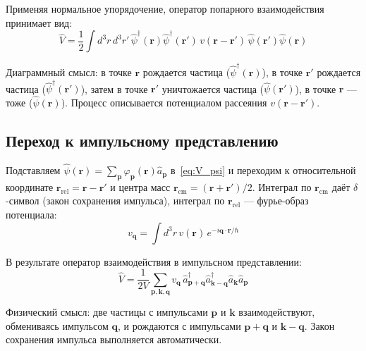 \documentclass[../general/general]{subfiles}
\begin{document}
Применяя нормальное упорядочение, оператор попарного взаимодействия принимает вид:
\begin{equation}
    \hat{V} = \frac{1}{2}\int d^3r\,d^3r'\,\hat{\psi}^\dagger(\mathbf{r})\hat{\psi}^\dagger(\mathbf{r}')\,v(\mathbf{r}-\mathbf{r}')\,\hat{\psi}(\mathbf{r}')\hat{\psi}(\mathbf{r})
    \label{eq:V_psi}
\end{equation}

Диаграммный смысл: в точке $\mathbf{r}$ рождается частица ($\hat{\psi}^\dagger(\mathbf{r})$), в точке $\mathbf{r}'$ рождается частица ($\hat{\psi}^\dagger(\mathbf{r}')$), затем в точке $\mathbf{r}'$ уничтожается частица ($\hat{\psi}(\mathbf{r}')$), в точке $\mathbf{r}$ --- тоже ($\hat{\psi}(\mathbf{r})$). Процесс описывается потенциалом рассеяния $v(\mathbf{r}-\mathbf{r}')$.

\subsection{Переход к импульсному представлению}

Подставляем $\hat{\psi}(\mathbf{r}) = \sum_\mathbf{p}\varphi_\mathbf{p}(\mathbf{r})\hat{a}_\mathbf{p}$ в~\eqref{eq:V_psi} и переходим к относительной координате $\mathbf{r}_{\text{rel}} = \mathbf{r} - \mathbf{r}'$ и центра масс $\mathbf{r}_{\text{cm}} = (\mathbf{r}+\mathbf{r}')/2$. Интеграл по $\mathbf{r}_{\text{cm}}$ даёт $\delta$-символ (закон сохранения импульса), интеграл по $\mathbf{r}_{\text{rel}}$ --- фурье-образ потенциала:
\begin{equation}
    v_\mathbf{q} = \int d^3r\,v(\mathbf{r})\,e^{-i\mathbf{q}\cdot\mathbf{r}/\hbar}
\end{equation}

В результате оператор взаимодействия в импульсном представлении:
\begin{equation}
    \boxed{\hat{V} = \frac{1}{2V}\sum_{\mathbf{p},\mathbf{k},\mathbf{q}} v_\mathbf{q}\,\hat{a}^\dagger_{\mathbf{p}+\mathbf{q}}\hat{a}^\dagger_{\mathbf{k}-\mathbf{q}}\hat{a}_\mathbf{k}\hat{a}_\mathbf{p}}
    \label{eq:V_momentum}
\end{equation}

Физический смысл: две частицы с импульсами $\mathbf{p}$ и $\mathbf{k}$ взаимодействуют, обмениваясь импульсом $\mathbf{q}$, и рождаются с импульсами $\mathbf{p}+\mathbf{q}$ и $\mathbf{k}-\mathbf{q}$. Закон сохранения импульса выполняется автоматически.



\end{document}
